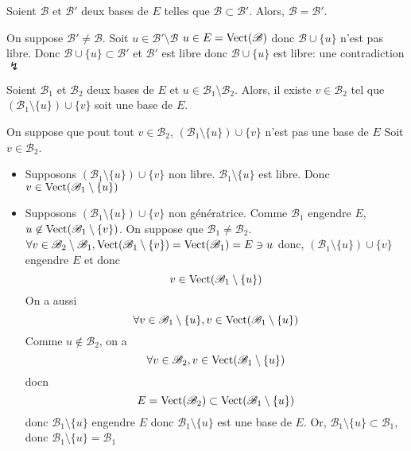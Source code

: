 \begin{lem}
	Soient $\mathcal{B}$ et $\mathcal{B}'$ deux bases de $E$ telles que $\mathcal{B}\subset \mathcal{B}'$. Alors, $\mathcal{B} = \mathcal{B}'$.
\end{lem}

\begin{prv}
	On suppose $\mathcal{B}' \neq \mathcal{B}$. Soit $u \in \mathcal{B}' \setminus \mathcal{B}$
	$u \in E = \operatorname{Vect}(\mathcal{B})$ donc $\mathcal{B} \cup \{u\}$ n'est pas libre.
	Donc $\mathcal{B}\cup \{u\} \subset \mathcal{B}'$ et $\mathcal{B}'$ est libre donc $\mathcal{B}\cup \{u\}$ est libre: une contradiction $\lightning$
\end{prv}

\begin{lem}
	 Soient $\mathcal{B}_1$ et $\mathcal{B}_2$ deux bases de $E$ et $u \in \mathcal{B}_1 \setminus \mathcal{B}_2$. Alors, il existe $v \in \mathcal{B}_2$ tel que $(\mathcal{B}_1 \setminus \{u\}) \cup \{v\}$ soit une base de $E$.
\end{lem}

\begin{prv}
	On suppose que pout tout $v \in \mathcal{B}_2$, $(\mathcal{B}_1\setminus \{u\}) \cup \{v\}$ n'est pas une base de $E$
	Soit $v \in \mathcal{B}_2$.
	\begin{itemize}
		\item Supposons $(\mathcal{B}_1\setminus \{u\})\cup \{v\}$ non libre. $\mathcal{B}_1 \setminus \{u\}$ est libre. Donc $v \in \operatorname{Vect}(\mathcal{B}_1 \setminus \{u\})$
		\item Supposons $(\mathcal{B}_1\setminus \{u\}) \cup \{v\}$ non génératrice.
			Comme $\mathcal{B}_1$ engendre $E$, $u \not\in \operatorname{Vect}(\mathcal{B}_1\setminus \{v\})$.
			On suppose que $\mathcal{B}_1 \neq \mathcal{B}_2$.
			$\forall v \in \mathcal{B}_2 \setminus \mathcal{B}_1, \operatorname{Vect}(\mathcal{B}_1 \setminus \{v\}) = \operatorname{Vect}(\mathcal{B}_1) = E \ni u$ 
			donc, $(\mathcal{B}_1\setminus \{u\}) \cup \{v\}$ engendre $E$ et donc \[
				v \in \operatorname{Vect}(\mathcal{B}_1 \setminus \{u\})
			\] On a aussi \[
				\forall v \in \mathcal{B}_1 \setminus \{u\}, v \in \operatorname{Vect}(\mathcal{B}_1\setminus \{u\})
			\] Comme $u \not\in \mathcal{B}_2$, on a \[
				\forall v \in \mathcal{B}_2, v \in \operatorname{Vect}(\mathcal{B}_1\setminus \{u\})
			\] docn \[
				E = \operatorname{Vect}(\mathcal{B}_2) \subset \operatorname{Vect}(\mathcal{B}_1\setminus \{u\})
			\] donc $\mathcal{B}_1\setminus \{u\}$ engendre $E$ donc $\mathcal{B}_1\setminus \{u\}$ est une base de $E$. Or, $\mathcal{B}_1 \setminus \{u\}  \subset  \mathcal{B}_1$, donc $\mathcal{B}_1\setminus \{u\} = \mathcal{B}_1$
	\end{itemize}
\end{prv}

